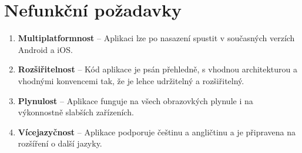 \section{Nefunkční požadavky}

\begin{enumerate}[label=\textbf{N\arabic*}, ref=N\arabic*]
    \item \textbf{Multiplatformnost} -- Aplikaci lze po nasazení spustit
v současných verzích Android a iOS.
    \item \textbf{Rozšiřitelnost} -- Kód aplikace je psán přehledně, s vhodnou
architekturou a vhodnými konvencemi tak, že je lehce udržitelný a rozšiřitelný.
    \item \textbf{Plynulost} -- Aplikace funguje na všech obrazovkých plynule
i na výkonnostně slabších zařízeních.
    \item \textbf{Vícejazyčnost} -- Aplikace podporuje češtinu a angličtinu
a je připravena na rozšíření o další jazyky.
\end{enumerate}
